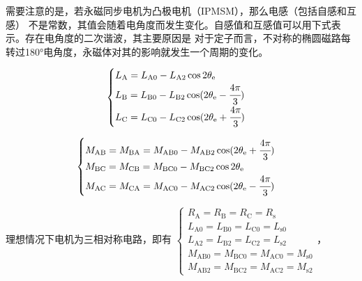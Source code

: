 需要注意的是，若永磁同步电机为凸极电机（IPMSM），那么电感（包括自感和互感）
不是常数，其值会随着电角度而发生变化。自感值和互感值可以用下式表示。存在电角度的二次谐波，其主要原因是
对于定子而言，不对称的椭圆磁路每转过180°电角度，永磁体对其的影响就发生一个周期的变化。
\begin{minipage}{0.5\textwidth}
    \begin{equation*}
        \begin{cases}
            L_{\mathrm{A}}=L_{\mathrm{A}0}-L_{\mathrm{A}2}\cos2\theta_{\mathrm{e}}\\
            L_{\mathrm{B}}=L_{\mathrm{B}0}-L_{\mathrm{B}2}\cos(2\theta_{\mathrm{e}}-\cfrac{4\pi}{3})\\
            L_{\mathrm{C}}=L_{\mathrm{C}0}-L_{\mathrm{C}2}\cos(2\theta_{\mathrm{e}}+\cfrac{4\pi}{3})
        \end{cases}
    \end{equation*}
\end{minipage}
\begin{minipage}{0.5\textwidth}
    \begin{equation*}
        \begin{cases}
            M_{\mathrm{AB}}=M_{\mathrm{BA}}=M_{\mathrm{AB}0}-M_{\mathrm{AB}2}\cos(2\theta_{\mathrm{e}}+\cfrac{4\pi}{3})\\
            M_{\mathrm{BC}}=M_{\mathrm{CB}}=M_{\mathrm{BC}0}-M_{\mathrm{BC}2}\cos2\theta_{\mathrm{e}}\\
            M_{\mathrm{AC}}=M_{\mathrm{CA}}=M_{\mathrm{AC}0}-M_{\mathrm{AC}2}\cos(2\theta_{\mathrm{e}}-\cfrac{4\pi}{3})
        \end{cases}
    \end{equation*}
\end{minipage}

理想情况下电机为三相对称电路，即有
\(\begin{cases}
    R_{\mathrm{A}}=R_{\mathrm{B}}=R_{\mathrm{C}}=R_{\mathrm{s}}\\
    L_{\mathrm{A}0}=L_{\mathrm{B}0}=L_{\mathrm{C}0}=L_{\mathrm{s}0}\\
    L_{\mathrm{A}2}=L_{\mathrm{B}2}=L_{\mathrm{C}2}=L_{\mathrm{s}2}\\
    M_{\mathrm{AB}0}=M_{\mathrm{BC}0}=M_{\mathrm{AC}0}=M_{\mathrm{s}0}\\
    M_{\mathrm{AB}2}=M_{\mathrm{BC}2}=M_{\mathrm{AC}2}=M_{\mathrm{s}2}
\end{cases}\)，

